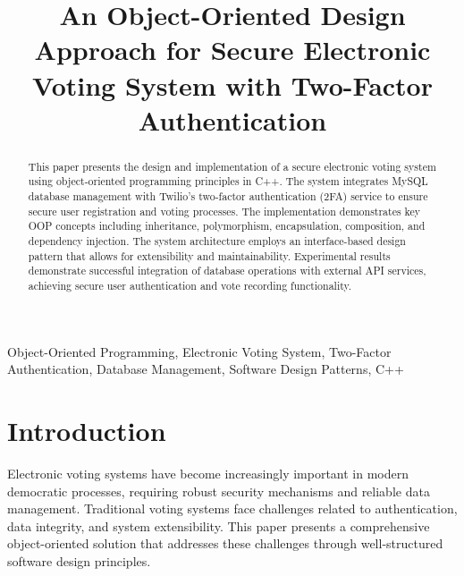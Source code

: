 \documentclass[conference]{IEEEtran}
\begin{document}
\title{An Object-Oriented Design Approach for Secure Electronic Voting System with Two-Factor Authentication}

\author{
\and
{}
}

\maketitle

\begin{abstract}
This paper presents the design and implementation of a secure electronic voting system using object-oriented programming principles in C++. The system integrates MySQL database management with Twilio's two-factor authentication (2FA) service to ensure secure user registration and voting processes. The implementation demonstrates key OOP concepts including inheritance, polymorphism, encapsulation, composition, and dependency injection. The system architecture employs an interface-based design pattern that allows for extensibility and maintainability. Experimental results demonstrate successful integration of database operations with external API services, achieving secure user authentication and vote recording functionality.
\end{abstract}

\begin{IEEEkeywords}
Object-Oriented Programming, Electronic Voting System, Two-Factor Authentication, Database Management, Software Design Patterns, C++
\end{IEEEkeywords}

\section{Introduction}
Electronic voting systems have become increasingly important in modern democratic processes, requiring robust security mechanisms and reliable data management. Traditional voting systems face challenges related to authentication, data integrity, and system extensibility. This paper presents a comprehensive object-oriented solution that addresses these challenges through well-structured software design principles.
\end{document}
